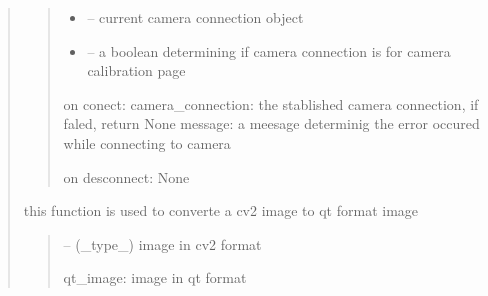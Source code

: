 \documentclass[letterpaper,10pt,english]{sphinxmanual}
\begin{document}
\begin{quote}
\begin{savenotes}
\begin{fulllineitems}
\begin{quote}
\begin{description}
\begin{itemize}
\item {} 
\sphinxAtStartPar
{} – current camera connection object

\item {} 
\sphinxAtStartPar
{} – a boolean determining if camera connection is for camera calibration page

\end{itemize}

\sphinxAtStartPar
on conect:
camera\_connection: the stablished camera connection, if faled, return None
message: a meesage determinig the error occured while connecting to camera

\sphinxAtStartPar
on desconnect: None

\end{description}\end{quote}

\end{fulllineitems}\end{savenotes}


\begin{savenotes}\begin{fulllineitems}
\label{\detokenize{setting/backend/camera_funcs:oxin.backend.camera_funcs.convert_cv2_to_qt_image}}
\pysigstartsignatures
{}
\pysigstopsignatures
\sphinxAtStartPar
this function is used to converte a cv2 image to qt format image
\begin{quote}\begin{description}
\sphinxAtStartPar
{} – (\_type\_) image in cv2 format

\sphinxAtStartPar
qt\_image: image in qt format

\end{description}\end{quote}

\end{fulllineitems}\end{savenotes}


\end{quote}
\end{document}
